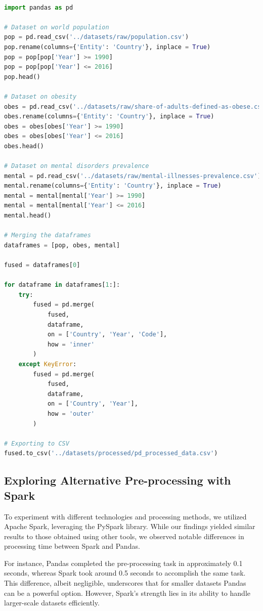 \documentclass[runningheads]{llncs}
\begin{document}
\begin{lstlisting}[language=Python,caption={Handling data with Python Pandas},label={lst:example}]

import pandas as pd

# Dataset on world population
pop = pd.read_csv('../datasets/raw/population.csv')
pop.rename(columns={'Entity': 'Country'}, inplace = True)
pop = pop[pop['Year'] >= 1990]
pop = pop[pop['Year'] <= 2016]
pop.head()

# Dataset on obesity
obes = pd.read_csv('../datasets/raw/share-of-adults-defined-as-obese.csv')
obes.rename(columns={'Entity': 'Country'}, inplace = True)
obes = obes[obes['Year'] >= 1990]
obes = obes[obes['Year'] <= 2016] 
obes.head()

# Dataset on mental disorders prevalence
mental = pd.read_csv('../datasets/raw/mental-illnesses-prevalence.csv')
mental.rename(columns={'Entity': 'Country'}, inplace = True)
mental = mental[mental['Year'] >= 1990]
mental = mental[mental['Year'] <= 2016] 
mental.head()

# Merging the dataframes
dataframes = [pop, obes, mental]

fused = dataframes[0]

for dataframe in dataframes[1:]:
    try:
        fused = pd.merge(
            fused,
            dataframe,
            on = ['Country', 'Year', 'Code'],
            how = 'inner'
        )
    except KeyError:
        fused = pd.merge(
            fused,
            dataframe,
            on = ['Country', 'Year'],
            how = 'outer'
        )

# Exporting to CSV
fused.to_csv('../datasets/processed/pd_processed_data.csv')
\end{lstlisting}

\subsection{Exploring Alternative Pre-processing with Spark}

To experiment with different technologies and processing methods, we utilized Apache Spark, leveraging the PySpark library. While our findings yielded similar results to those obtained using other tools, we observed notable differences in processing time between Spark and Pandas.

For instance, Pandas completed the pre-processing task in approximately 0.1 seconds, whereas Spark took around 0.5 seconds to accomplish the same task. This difference, albeit negligible, underscores that for smaller datasets Pandas can be a powerful option. However, Spark's strength lies in its ability to handle larger-scale datasets efficiently.
\end{document}
